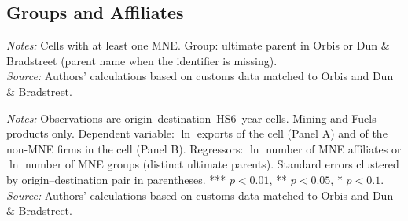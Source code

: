 \documentclass[11pt,a4paper]{article}
\begin{document}
\subsection{Groups and Affiliates}
\begin{table}[H]\centering\small%
  \caption{Mining and Fuels: Multinational Affiliates and Groups in Origin--Destination--Product--Year Cells}%
  \label{tab:grp_mining}%
  \par\vspace{3pt}%
  \begin{minipage}{0.95\textwidth}\footnotesize %
  \textit{Notes:} Cells with at least one MNE. Group: ultimate parent in Orbis or Dun \& Bradstreet (parent name when the identifier is missing).\\[3pt]%
  \textit{Source:} Authors' calculations based on customs data matched to Orbis and Dun \& Bradstreet.%
  \end{minipage}%
  \end{table}
\begin{table}[H]\centering\small%
  \caption{Mining and Fuels: Multinational Presence and Exports: Affiliates and Groups}%
  \label{tab:grp_r_mining}%
  \par\vspace{3pt}%
  \begin{minipage}{0.95\textwidth}\footnotesize %
  \textit{Notes:} Observations are origin--destination--HS6--year cells. Mining and Fuels products only. Dependent variable: $\ln$ exports of the cell (Panel A) and of the non-MNE firms in the cell (Panel B). Regressors: $\ln$ number of MNE affiliates or $\ln$ number of MNE groups (distinct ultimate parents). Standard errors clustered by origin--destination pair in parentheses. *** $p<0.01$, ** $p<0.05$, * $p<0.1$.\\[3pt]%
  \textit{Source:} Authors' calculations based on customs data matched to Orbis and Dun \& Bradstreet.%
  \end{minipage}%
  \end{table}
\end{document}
